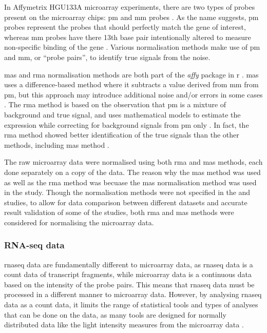 In Affymetrix HGU133A microarray experiments, there are two types of probes present on the microarray chips: \gls{pm} and \gls{mm} probes \citep{Irizarry2003}.
As the name suggests, \gls{pm} probes represent the probes that should perfectly match the gene of interest, whereas \gls{mm} probes have there 13th base pair intentionally altered to measure non-specific binding of the gene \citep{Irizarry2003}.
Various normalisation methods make use of \gls{pm} and \gls{mm}, or ``probe pairs'', to identify true signals from the noise.

\Gls{mas} and \gls{rma} normalisation methods are both part of the \textit{affy} package in \gls{r} \citep{Gautier2004}.
\Gls{mas} uses a difference-based method where it subtracts a value derived from \gls{mm} from \gls{pm}, but this approach may introduce additional noise and/or errors in some cases \citep{Irizarry2003}.
The \gls{rma} method is based on the observation that \gls{pm} is a mixture of background and true signal, and uses mathematical models to estimate the expression while correcting for background signals from \gls{pm} only \citep{Irizarry2003}.
In fact, the \gls{rma} method showed better identification of the true signals than the other methods, including \Gls{mas} method \citep{Irizarry2003}.

The raw microarray data were normalised using both \gls{rma} and \gls{mas} methods, each done separately on a copy of the data.
The reason why the \gls{mas} method was used as well as the \gls{rma} method was becuase the \gls{mas} normalisation method was used in the \citet{Gatza2010a} study.
Though the normalisation methods were not specified in the \citet{Creighton2012} and \citet{Fuentes-Mattei2014} studies, to allow for data comparison between different datasets and accurate result validation of some of the studies, both \gls{rma} and \gls{mas} methods were considered for normalising the microarray data.

\subsubsection{RNA-seq data}
\label{ssub:rna_seq_data}

\gls{rnaseq} data are fundamentally different to microarray data, as \gls{rnaseq} data is a count data of transcript fragments, while microarray data is a continuous data based on the intensity of the probe pairs.
This means that \gls{rnaseq} data must be processed in a different manner to microarray data.
However, by analysing \gls{rnaseq} data as a count data, it limits the range of statistical tools and types of analyses that can be done on the data, as many tools are designed for normally distributed data like the light intensity measures from the microarray data \citep{Law2014}.


